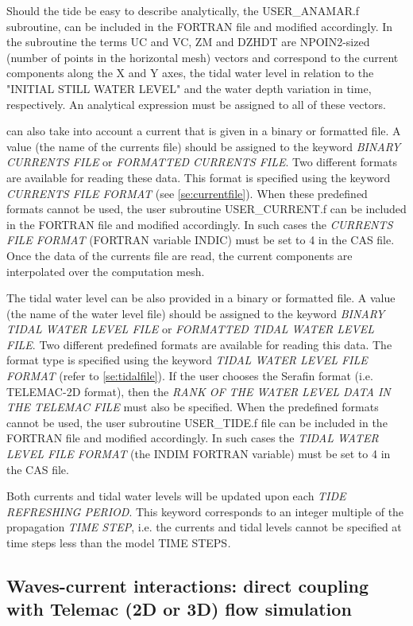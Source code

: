  Should the tide be easy to describe analytically, the USER\_ANAMAR.f subroutine, can be included in the FORTRAN file and modified accordingly. In the subroutine the terms UC and VC, ZM and DZHDT are NPOIN2-sized (number of points in the horizontal mesh) vectors and correspond to the current components along the X and Y axes, the tidal water level in relation to the "INITIAL STILL WATER LEVEL" and the water depth variation in time, respectively. An analytical expression must be assigned to all of these vectors.

 \tomawac can also take into account a current that is given in a binary or formatted file. A value (the name of the currents file) should be assigned to the keyword \textit{BINARY CURRENTS FILE} or\textit{ FORMATTED CURRENTS FILE}. Two different formats are available for reading these data. This format is specified using the keyword \textit{CURRENTS FILE FORMAT} (see \ref{se:currentfile}). When these predefined formats cannot be used, the user subroutine USER\_CURRENT.f can be included in the FORTRAN file and modified accordingly. In such cases the \textit{CURRENTS FILE FORMAT} (FORTRAN variable INDIC) must be set to 4 in the CAS file. Once the data of the currents file are read, the current components are interpolated over the computation mesh.

 The tidal water level can be also provided in a binary or formatted file. A value (the name of the water level file) should be assigned to the keyword \textit{BINARY TIDAL WATER LEVEL FILE} or\textit{ FORMATTED TIDAL WATER LEVEL FILE}. Two different predefined formats are available for reading this data. The format type is specified using the keyword \textit{TIDAL WATER LEVEL FILE FORMAT} (refer to \ref{se:tidalfile}). If the user chooses the Serafin format (i.e. TELEMAC-2D format), then the \textit{RANK OF THE WATER LEVEL DATA IN THE TELEMAC FILE} must also be specified. When the predefined formats cannot be used, the user subroutine USER\_TIDE.f file can be included in the FORTRAN file and modified accordingly. In such cases the \textit{TIDAL WATER LEVEL FILE FORMAT} (the INDIM FORTRAN variable) must be set to 4 in the CAS file.

 Both currents and tidal water levels will be updated upon each \textit{TIDE REFRESHING PERIOD}. This keyword corresponds to an integer multiple of the propagation \textit{TIME STEP}, i.e. the currents and tidal levels cannot be specified at time steps less than the model TIME STEPS\textit{.}


\subsection{ Waves-current interactions: direct coupling with Telemac (2D or 3D) flow simulation}

